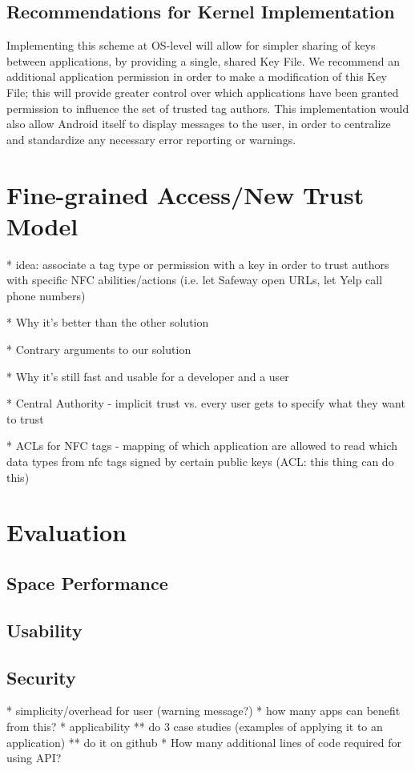 \documentclass[12pt]{article}
\begin{document}
\subsection{Recommendations for Kernel Implementation}
Implementing this scheme at OS-level will allow for simpler sharing of keys between applications, by providing a single, shared Key File.
We recommend an additional application permission in order to make a modification of this Key File; this will provide greater control over which applications have been granted permission to influence the set of trusted tag authors.
This implementation would also allow Android itself to display messages to the user, in order to centralize and standardize any necessary error reporting or warnings.


\section{Fine-grained Access/New Trust Model}
* idea: associate a tag type or permission with a key in order to trust authors with specific NFC abilities/actions (i.e. let Safeway open URLs, let Yelp call phone numbers)

* Why it's better than the other solution

* Contrary arguments to our solution

* Why it's still fast and usable for a developer and a user

* Central Authority - implicit trust vs. every user gets to specify what they want to trust
 
* ACLs for NFC tags - mapping of which application are allowed to read which data types from nfc tags signed by certain public keys (ACL: this thing can do this)

\section{Evaluation}
\subsection{Space Performance}
\subsection{Usability}
\subsection{Security}
* simplicity/overhead for user (warning message?)
* how many apps can benefit from this?
* applicability
** do 3 case studies (examples of applying it to an application)
** do it on github
* How many additional lines of code required for using API?
\end{document}
